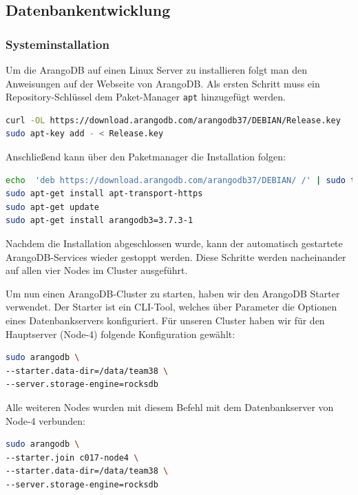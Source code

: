 \subsection{Datenbankentwicklung}
\subsubsection{Systeminstallation}
Um die ArangoDB auf einen Linux Server zu installieren folgt man den Anweisungen auf der Webseite von ArangoDB.
Als ersten Schritt muss ein Repository-Schlüssel dem Paket-Manager \texttt{apt} hinzugefügt werden.
\begin{lstlisting}[language=bash, caption=Hinzufügen des Repository-Schlüssels für ArangoDB]
curl -OL https://download.arangodb.com/arangodb37/DEBIAN/Release.key
sudo apt-key add - < Release.key
\end{lstlisting}
Anschließend kann über den Paketmanager die Installation folgen:
\begin{lstlisting}[language=bash, caption=Installieren von ArangoDB mit Package Manager]
echo  'deb https://download.arangodb.com/arangodb37/DEBIAN/ /' | sudo tee /etc/apt/sources.list.d/arangodb.list
sudo apt-get install apt-transport-https
sudo apt-get update
sudo apt-get install arangodb3=3.7.3-1
\end{lstlisting}
Nachdem die Installation abgeschlossen wurde, kann der automatisch gestartete ArangoDB-Services wieder gestoppt werden. Diese Schritte werden nacheinander auf allen vier Nodes im Cluster ausgeführt. \cite{ADB_install}

Um nun einen ArangoDB-Cluster zu starten, haben wir den ArangoDB Starter verwendet. Der Starter ist ein \ac{CLI}-Tool, welches über Parameter die Optionen eines Datenbankservers konfiguriert. 
Für unseren Cluster haben wir für den Hauptserver (Node-4) folgende Konfiguration gewählt:
\begin{lstlisting}[language=bash, caption=Starten des Hauptservers]
sudo arangodb \
--starter.data-dir=/data/team38 \
--server.storage-engine=rocksdb
\end{lstlisting}
Alle weiteren Nodes wurden mit diesem Befehl mit dem Datenbankserver von Node-4 verbunden:
\begin{lstlisting}[language=sh, caption=Zuscahlten der anderen Datenbankserver für Cluster]
sudo arangodb \
--starter.join c017-node4 \
--starter.data-dir=/data/team38 \
--server.storage-engine=rocksdb
\end{lstlisting}
\citep{ADB_starter}


